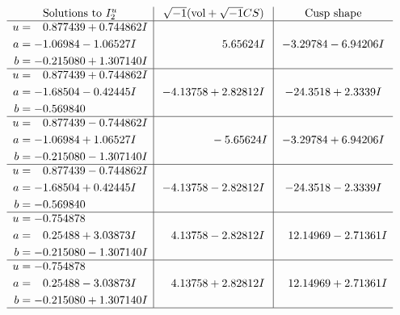 \documentclass[1p]{elsarticle_modified}
\theoremstyle{definition}
\newcommand{\I}{\sqrt{-1}}
\begin{document}
$$\begin{array}{c|c|c}  
\text{Solutions to }I^u_{2}& \I (\text{vol} + \sqrt{-1}CS) & \text{Cusp shape}\\
 \hline 
\begin{aligned}
u &= \phantom{-}0.877439 + 0.744862 I \\
a &= -1.06984 - 1.06527 I \\
b &= -0.215080 + 1.307140 I\end{aligned}
 & \phantom{-0.000000 -}5.65624 I & -3.29784 - 6.94206 I \\ \hline\begin{aligned}
u &= \phantom{-}0.877439 + 0.744862 I \\
a &= -1.68504 - 0.42445 I \\
b &= -0.569840\phantom{ +0.000000I}\end{aligned}
 & -4.13758 + 2.82812 I & -24.3518 + 2.3339 I \\ \hline\begin{aligned}
u &= \phantom{-}0.877439 - 0.744862 I \\
a &= -1.06984 + 1.06527 I \\
b &= -0.215080 - 1.307140 I\end{aligned}
 & \phantom{-0.000000 } -5.65624 I & -3.29784 + 6.94206 I \\ \hline\begin{aligned}
u &= \phantom{-}0.877439 - 0.744862 I \\
a &= -1.68504 + 0.42445 I \\
b &= -0.569840\phantom{ +0.000000I}\end{aligned}
 & -4.13758 - 2.82812 I & -24.3518 - 2.3339 I \\ \hline\begin{aligned}
u &= -0.754878\phantom{ +0.000000I} \\
a &= \phantom{-}0.25488 + 3.03873 I \\
b &= -0.215080 - 1.307140 I\end{aligned}
 & \phantom{-}4.13758 - 2.82812 I & \phantom{-}12.14969 - 2.71361 I \\ \hline\begin{aligned}
u &= -0.754878\phantom{ +0.000000I} \\
a &= \phantom{-}0.25488 - 3.03873 I \\
b &= -0.215080 + 1.307140 I\end{aligned}
 & \phantom{-}4.13758 + 2.82812 I & \phantom{-}12.14969 + 2.71361 I\\
 \hline 
 \end{array}$$\newpage\newpage\renewcommand{\arraystretch}{1}
\end{document}
